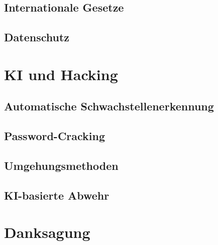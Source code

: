 \documentclass[12pt, a4paper]{article}
\begin{document}
\subsection{Internationale Gesetze}

\subsection{Datenschutz}


\section{KI und Hacking}

\subsection{Automatische Schwachstellenerkennung}

\subsection{Password-Cracking}

\subsection{Umgehungsmethoden}

\subsection{KI-basierte Abwehr}

\section*{Danksagung}


\newpage
\printbibliography
\end{document}
